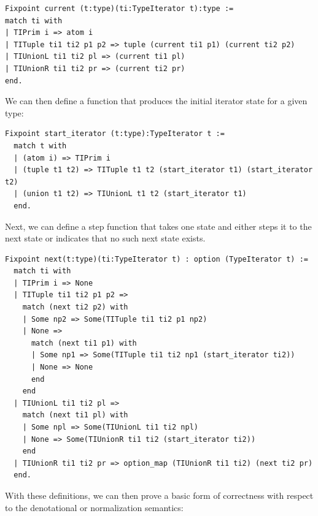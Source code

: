 \documentclass[a4paper,english]{lipics-v2019}
\begin{document}
\begin{small}\begin{verbatim}
Fixpoint current (t:type)(ti:TypeIterator t):type :=
match ti with
| TIPrim i => atom i
| TITuple ti1 ti2 p1 p2 => tuple (current ti1 p1) (current ti2 p2)
| TIUnionL ti1 ti2 pl => (current ti1 pl)
| TIUnionR ti1 ti2 pr => (current ti2 pr)
end.
\end{verbatim}
\end{small}

\noindent We can then define a function that produces the initial iterator state for a
given type:

\begin{small}
\begin{verbatim}
Fixpoint start_iterator (t:type):TypeIterator t :=
  match t with
  | (atom i) => TIPrim i
  | (tuple t1 t2) => TITuple t1 t2 (start_iterator t1) (start_iterator t2)
  | (union t1 t2) => TIUnionL t1 t2 (start_iterator t1)
  end.
\end{verbatim}
\end{small}

\noindent Next, we can define a step function that takes one state and either steps it
to the next state or indicates that no such next state exists.

\begin{small}\begin{verbatim}
Fixpoint next(t:type)(ti:TypeIterator t) : option (TypeIterator t) :=
  match ti with
  | TIPrim i => None
  | TITuple ti1 ti2 p1 p2 =>
    match (next ti2 p2) with
    | Some np2 => Some(TITuple ti1 ti2 p1 np2)
    | None =>
      match (next ti1 p1) with
      | Some np1 => Some(TITuple ti1 ti2 np1 (start_iterator ti2))
      | None => None
      end
    end
  | TIUnionL ti1 ti2 pl =>
    match (next ti1 pl) with
    | Some npl => Some(TIUnionL ti1 ti2 npl)
    | None => Some(TIUnionR ti1 ti2 (start_iterator ti2))
    end
  | TIUnionR ti1 ti2 pr => option_map (TIUnionR ti1 ti2) (next ti2 pr)
  end.
\end{verbatim}\end{small}

With these definitions, we can then prove a basic form of correctness with
respect to the denotational or normalization semantics:
\end{document}
